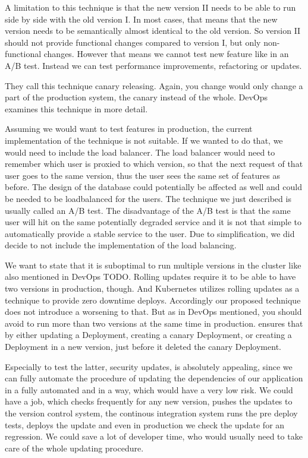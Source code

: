 A limitation to this technique is that the new version II needs to be able to run side by
side with the old version I. In most cases, that means that the new version needs to be
semantically almost identical to the old version. So version II should not provide
functional changes compared to version I, but only non-functional changes. However that
means we cannot test new feature like in an A/B test. Instead we can test performance
improvements, refactoring or updates.

They call this technique canary releasing. Again, you change would only change a part of
the production system, the canary instead of the whole. DevOps~\cite{cd_humble_deploy}
examines this technique in more detail.

Assuming we would want to test features in production, the current implementation of the
technique is not suitable. If we wanted to do that, we would need to include the
load balancer. The load balancer would need to remember which user is proxied to which
version, so that the next request of that user goes to the same version, thus the user
sees the same set of features as before. The design of the database could potentially be
affected as well and could be needed to be loadbalanced for the users. The technique we
just described is usually called an A/B test. The disadvantage of the A/B test is that the
same user will hit on the same potentially degraded service and it is not that simple to
automatically provide a stable service to the user. Due to simplification, we did decide
to not include the implementation of the load balancing.

We want to state that it is suboptimal to run multiple versions in the cluster like also
mentioned in DevOps TODO. Rolling updates require it to be able to have two versions in
production, though. And Kubernetes utilizes rolling updates as a technique to provide zero
downtime deploys. Accordingly our proposed technique does not introduce a worsening to
that. But as in DevOps mentioned, you should avoid to run more than two versions at the
same time in production. \deployer ensures that by either updating a Deployment, creating a
canary Deployment, or creating a Deployment in a new version, just before it deleted the
canary Deployment.

Especially to test the latter, security updates, is absolutely appealing, since we can
fully automate the procedure of updating the dependencies of our application in a fully
automated and in a way, which would have a very low risk. We could have a job, which
checks frequently for any new version, pushes the updates to the version control system,
the continous integration system runs the pre deploy tests, \deployer deploys the update
and even in production we check the update for an regression. We could save a lot of
developer time, who would usually need to take care of the whole updating procedure.

